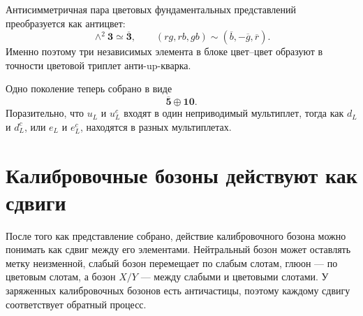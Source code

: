 \begin{classroomqa}
\end{classroomqa}

Антисимметричная пара цветовых фундаментальных представлений преобразуется как антицвет:
\begin{equation}
\wedge^2\mathbf3\simeq\overline{\mathbf3},
\qquad
(rg,rb,gb)\sim(\overline b,-\overline g,\overline r).
\label{eq:l10-anticolor}
\end{equation}
Именно поэтому три независимых элемента в блоке цвет--цвет образуют в точности цветовой триплет анти-up-кварка.

Одно поколение теперь собрано в виде
\begin{equation}
\overline{\mathbf5}\oplus\mathbf{10}.
\label{eq:l10-family}
\end{equation}
Поразительно, что \(u_L\) и \(u^c_L\) входят в один неприводимый мультиплет, тогда как \(d_L\) и \(d^c_L\), или \(e_L\) и \(e^c_L\), находятся в разных мультиплетах.

\begin{classroomqa}
\end{classroomqa}

\section{Калибровочные бозоны действуют как сдвиги}

После того как представление собрано, действие калибровочного бозона можно понимать как сдвиг между его элементами. Нейтральный бозон может оставлять метку неизменной, слабый бозон перемещает по слабым слотам, глюон — по цветовым слотам, а бозон \(X/Y\) — между слабыми и цветовыми слотами. У заряженных калибровочных бозонов есть античастицы, поэтому каждому сдвигу соответствует обратный процесс.

